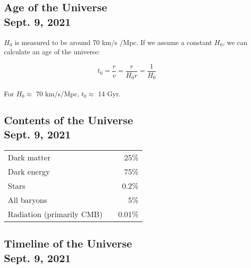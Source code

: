 \documentclass[]{article}
\begin{document}
\subsection{Age of the Universe\\ {\large \normalfont Sept. 9, 2021}}
\bigbreak

$H_0$ is measured to be around 70 km/s /Mpc. If we assume a constant $H_0$, we can calculate an age of the universe:

\begin{equation*}
	t_0 = \frac{r}{v} = \frac{r}{H_0 r} = \frac{1}{H_0}
\end{equation*}\\

For $H_0 \approx$ 70 km/s/Mpc, $t_0 \approx$ 14 Gyr.\\


\subsection{Contents of the Universe\\ {\large \normalfont Sept. 9, 2021}}
\bigbreak

\begin{center}
	\begin{tabular}{lcr}
		Dark matter & & 25\% \\
		Dark energy & & ~75\% \\
		Stars & & 0.2\% \\
		All baryons & & 5\% \\
		Radiation (primarily CMB) & & 0.01\% \\
	\end{tabular}
\end{center}\bigbreak

\subsection{Timeline of the Universe\\ {\large \normalfont Sept. 9, 2021}}
\bigbreak
\end{document}
